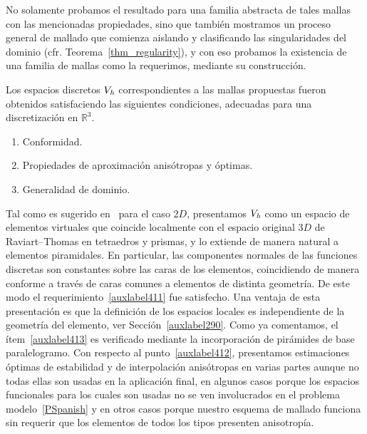 No solamente probamos el resultado para una familia abstracta
de tales mallas con las mencionadas propiedades,
 sino que tambi\'en mostramos un proceso general de mallado
 que comienza aislando y clasificando las singularidades
del dominio (cfr. Teorema~\ref{thm_regularity}), y
con eso probamos la existencia de una familia de mallas
como la requerimos, mediante su construcci\'on.

Los espacios discretos $V_{\textit h}$ correspondientes
a las mallas propuestas fueron obtenidos satisfaciendo
las siguientes condiciones, adecuadas para una discretiza\-ci\'on
en $\mathbb{R}^3$.
\begin{enumerate}
	\item \label{auxlabel411} Conformidad.
	\item \label{auxlabel412} Propiedades de aproximaci\'on anis\'otropas y \'optimas.
	\item \label{auxlabel413} Generalidad de dominio.
\end{enumerate}
Tal como es sugerido en~\cite{bfm} para el caso $2D$,
presentamos $V_{\textit h}$ como un espacio de elementos 
virtuales que coincide localmente con el espacio original
$3D$ de Raviart--Thomas en tetraedros y prismas, y lo
extiende de manera natural a elementos piramidales. 
En particular, las componentes normales de las
funciones discretas son constantes sobre las caras de
los elementos, coincidiendo de manera conforme a trav\'es 
de caras comunes a elementos de distinta geometr\'ia. De
este modo el requerimiento~\ref{auxlabel411} fue satisfecho.
Una ventaja de esta presentaci\'on es que la definici\'on
de los espacios locales es independiente de la geometr\'ia 
del elemento, ver Secci\'on~\ref{auxlabel290}. Como ya comentamos,
el \'item~\ref{auxlabel413} es verificado mediante la 
incorporaci\'on de pir\'amides de base paralelogramo.
Con respecto al punto~\ref{auxlabel412}, presentamos
estimaciones \'optimas de estabilidad y de interpolaci\'on
anis\'otropas en varias partes aunque no todas ellas
son usadas en la aplicaci\'on final, en algunos casos
porque los espacios funcionales para los cuales son usadas
no se ven involucrados en el problema 
modelo~\eqref{PSpanish} y en otros casos porque
nuestro esquema de mallado funciona sin requerir
que los elementos de todos los tipos presenten 
anisotrop\'ia.

